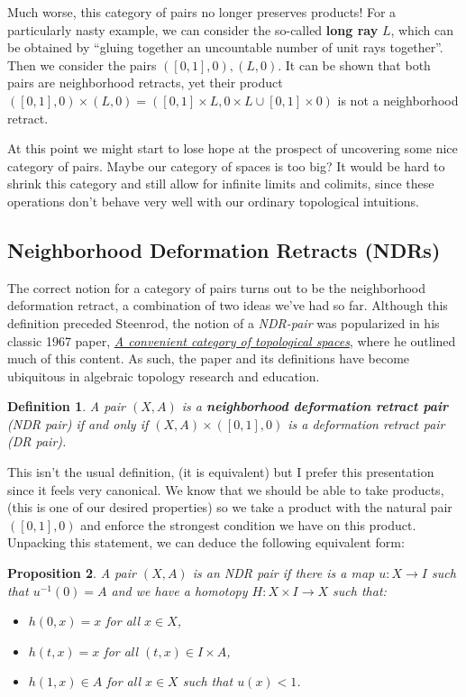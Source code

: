 \documentclass[12pt]{article}
\newtheorem{definition}{Definition}[subsection]
\newtheorem{proposition}[definition]{Proposition}
\begin{document}
Much worse, this category of pairs no longer preserves products! For a particularly nasty example, we can consider the so-called \textbf{long ray} $L$, which can be obtained by ``gluing together an uncountable number of unit rays together''. Then we consider the pairs $([0,1], 0), (L, 0)$. It can be shown that both pairs are neighborhood retracts, yet their product $([0,1], 0)\times (L, 0) = ([0,1]\times L, 0\times L\cup [0,1]\times 0)$ is not a neighborhood retract.

At this point we might start to lose hope at the prospect of uncovering some nice category of pairs. Maybe our category of spaces is too big? It would be hard to shrink this category and still allow for infinite limits and colimits, since these operations don't behave very well with our ordinary topological intuitions. 

\subsection{Neighborhood Deformation Retracts (NDRs)}

The correct notion for a category of pairs turns out to be the neighborhood deformation retract, a combination of two ideas we've had so far. Although this definition preceded Steenrod, the notion of a \emph{NDR-pair} was popularized in his classic 1967 paper, \underline{\emph{A convenient category of topological spaces}}, where he outlined much of this content. As such, the paper and its definitions have become ubiquitous in algebraic topology research and education. 

\begin{definition}
  A pair $(X,A)$ is a \textbf{neighborhood deformation retract pair} (NDR pair) if and only if $(X,A)\times ([0,1], 0)$ is a deformation retract pair (DR pair).
\end{definition}

This isn't the usual definition, (it is equivalent) but I prefer this presentation since it feels very canonical. We know that we should be able to take products, (this is one of our desired properties) so we take a product with the natural pair $([0,1],0)$ and enforce the strongest condition we have on this product. Unpacking this statement, we can deduce the following equivalent form: 

\begin{proposition}
  A pair $(X,A)$ is an NDR pair if there is a map $u : X \to I$ such that $u^{-1}(0)=A$ and we have a homotopy $H :X \times I \to X$ such that:
  \begin{itemize}
    \item $h(0,x)=x$ for all $x\in X$,
    \item $h(t,x)=x$ for all $(t,x)\in I\times A$,
    \item $h(1,x)\in A$ for all $x\in X$ such that $u(x)<1$.
  \end{itemize}
\end{proposition}
\end{document}
